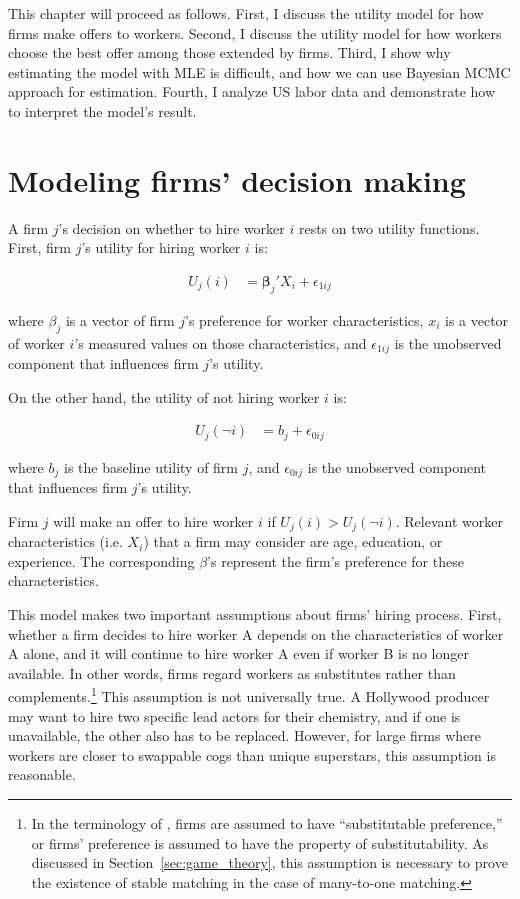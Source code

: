 This chapter will proceed as follows. First, I discuss the utility model for how
firms make offers to workers. Second, I discuss the utility model for how
workers choose the best offer among those extended by firms. Third, I show why
estimating the model with MLE is difficult, and how we can use Bayesian MCMC
approach for estimation. Fourth, I analyze US labor data and demonstrate how to
interpret the model's result.

\section{Modeling firms' decision making}

A firm $j$'s decision on whether to hire worker $i$ rests on two utility
functions. First, firm $j$'s utility for hiring worker $i$ is:

\begin{align}
  U_j(i) &= \bm{\beta}_j' X_i + \epsilon_{1ij}
\end{align}

where $\beta_j$ is a vector of firm $j$'s preference for worker characteristics,
$x_i$ is a vector of worker $i$'s measured values on those characteristics, and
$\epsilon_{1ij}$ is the unobserved component that influences firm $j$'s utility.

On the other hand, the utility of not hiring worker $i$ is:

\begin{align}
  U_j(\neg i) &= b_j + \epsilon_{0ij}
\end{align}

where $b_j$ is the baseline utility of firm $j$, and $\epsilon_{0ij}$ is the
unobserved component that influences firm $j$'s utility.

Firm $j$ will make an offer to hire worker $i$ if $U_j(i) > U_j(\neg i)$.
Relevant worker characteristics (i.e. $X_i$) that a firm may consider are age,
education, or experience. The corresponding $\beta$'s represent the firm's
preference for these characteristics.

This model makes two important assumptions about firms' hiring process. First,
whether a firm decides to hire worker A depends on the characteristics of worker
A alone, and it will continue to hire worker A even if worker B is no longer
available. In other words, firms regard workers as substitutes rather than
complements.\footnote{In the terminology of \citet{Roth1992}, firms are assumed
  to have ``substitutable preference,'' or firms' preference is assumed to have
  the property of substitutability. As discussed in
  Section~\ref{sec:game_theory}, this assumption is necessary to prove the
  existence of stable matching in the case of many-to-one matching.} This
assumption is not universally true. A Hollywood producer may want to hire two
specific lead actors for their chemistry, and if one is unavailable, the other
also has to be replaced. However, for large firms where workers are closer to
swappable cogs than unique superstars, this assumption is reasonable.

